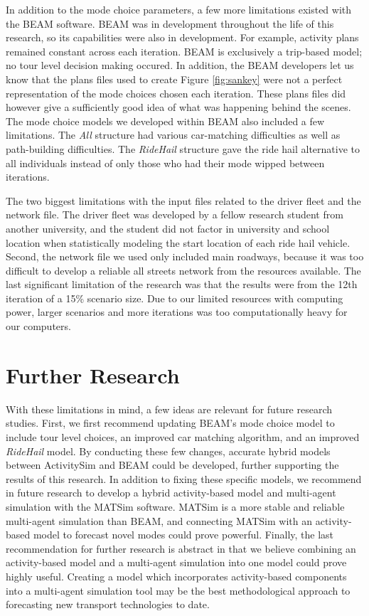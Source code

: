 \documentclass[12pt, oneside, openright]{byuthesis}
\begin{document}
In addition to the mode choice parameters, a few more limitations existed with the BEAM software. BEAM was in development throughout the life of this research, so its capabilities were also in development. For example, activity plans remained constant across each iteration. BEAM is exclusively a trip-based model; no tour level decision making occured. In addition, the BEAM developers let us know that the plans files used to create Figure \ref{fig:sankey} were not a perfect representation of the mode choices chosen each iteration. These plans files did however give a sufficiently good idea of what was happening behind the scenes. The mode choice models we developed within BEAM also included a few limitations. The \emph{All} structure had various car-matching difficulties as well as path-building difficulties. The \emph{RideHail} structure gave the ride hail alternative to all individuals instead of only those who had their mode wipped between iterations.

The two biggest limitations with the input files related to the driver fleet and the network file. The driver fleet was developed by a fellow research student from another university, and the student did not factor in university and school location when statistically modeling the start location of each ride hail vehicle. Second, the network file we used only included main roadways, because it was too difficult to develop a reliable all streets network from the resources available. The last significant limitation of the research was that the results were from the 12th iteration of a 15\% scenario size. Due to our limited resources with computing power, larger scenarios and more iterations was too computationally heavy for our computers.

\hypertarget{further-research}{%
\section{Further Research}\label{further-research}}

With these limitations in mind, a few ideas are relevant for future research studies. First, we first recommend updating BEAM's mode choice model to include tour level choices, an improved car matching algorithm, and an improved \emph{RideHail} model. By conducting these few changes, accurate hybrid models between ActivitySim and BEAM could be developed, further supporting the results of this research. In addition to fixing these specific models, we recommend in future research to develop a hybrid activity-based model and multi-agent simulation with the MATSim software. MATSim is a more stable and reliable multi-agent simulation than BEAM, and connecting MATSim with an activity-based model to forecast novel modes could prove powerful. Finally, the last recommendation for further research is abstract in that we believe combining an activity-based model and a multi-agent simulation into one model could prove highly useful. Creating a model which incorporates activity-based components into a multi-agent simulation tool may be the best methodological approach to forecasting new transport technologies to date.
\end{document}
